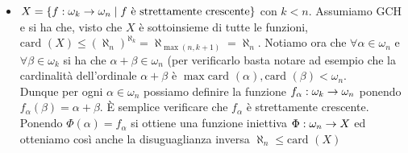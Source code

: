 \documentclass[a4paper,NoNotes,GeneralMath]{stdmdoc}
\newcommand{\card}[1]{\text{card }({#1})}
\begin{document}
\begin{itemize}
		\item $X = \{ f: \omega_k \rightarrow \omega_n \mid f \text{ è strettamente crescente} \}$ con $k < n$. Assumiamo GCH e si ha che, visto che $X$ è sottoinsieme di tutte le funzioni, $\card{X} \le (\aleph_n)^{\aleph_k} = \aleph_{\max(n, k + 1)} = \aleph_n$. Notiamo ora che $\forall \alpha \in \omega_n$ e $\forall \beta \in \omega_k$ si ha che $\alpha + \beta \in \omega_n$ (per verificarlo basta notare ad esempio che la cardinalità dell'ordinale $\alpha + \beta$ è $\max{\card{\alpha}, \card{\beta}} < \omega_n$. \\
			Dunque per ogni $\alpha \in \omega_n$ possiamo definire la funzione $f_\alpha: \omega_k \rightarrow \omega_n$ ponendo $f_\alpha (\beta) = \alpha + \beta$. È semplice verificare che $f_\alpha$ è strettamente crescente. Ponendo $\Phi(\alpha) = f_\alpha$ si ottiene una funzione iniettiva $\Phi: \omega_n \rightarrow X$ ed otteniamo così anche la disuguaglianza inversa $\aleph_n \le \card{X}$
	\end{itemize}
	
\end{document}
